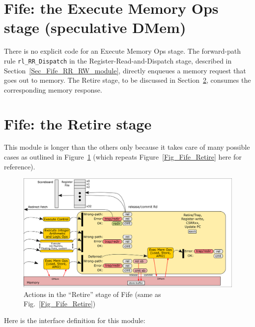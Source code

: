 
\section{Fife: the Execute Memory Ops stage (speculative DMem)}

\label{Sec_Fife_DMem_stage}

There is no explicit code for an Execute Memory Ops stage.  The
forward-path rule \verb|rl_RR_Dispatch| in the
Register-Read-and-Dispatch stage, described in
Section~\ref{Sec_Fife_RR_RW_module}, directly enqueues a memory
request that goes out to memory.  The Retire stage, to be discussed in
Section~\ref{Sec_Fife_Retire_code}, consumes the corresponding memory
response.


\section{Fife: the Retire stage}

\label{Sec_Fife_Retire_code}

This module is longer than the others only because it takes care of
many possible cases as outlined in Figure~\ref{Fig_Fife_Retire_2}
(which repeats Figure~\ref{Fig_Fife_Retire} here for reference).
\begin{figure}[htbp]
  \centerline{\includegraphics[width=6in,angle=0]{Figures/Fig_Fife_Retire}}
  \caption{\label{Fig_Fife_Retire_2}
           Actions in the ``Retire'' stage of Fife
	   (same as Fig.~\ref{Fig_Fife_Retire})}
\end{figure}

Here is the interface definition for this module:

